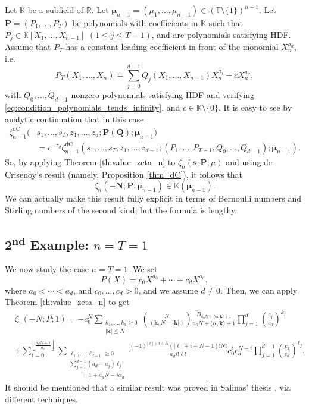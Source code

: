 \documentclass[a4paper,12pt]{article}
\theoremstyle{definition}
\numberwithin{equation}{section}
\newcommand{\dc}{\mathrm{dC}}
\begin{document}
Let $\mathbb{K}$ be a subfield of $\mathbb{R}$. Let $\boldsymbol{\mu}_{n-1}=(\mu_1,\ldots,\mu_{n-1}) \in (\mathbb{T} \setminus \{ 1 \})^{n-1}$. Let $\mathbf{P}=(P_1,\ldots,P_T)$ be polynomials with coefficients in $\mathbb{K}$ such that $P_j \in \mathbb{K}[X_1,\ldots,X_{n-1}]$ $(1 \leq j \leq T-1)$, and are polynomials satisfying HDF. Assume that $P_T$ has a constant leading coefficient in front of the monomial $X_n^{a_d}$, i.e.
$$ P_T(X_1,\ldots,X_n) = \sum_{j=0}^{d-1} Q_j(X_1,\ldots,X_{n-1}) X_n^{a_j}+cX_n^{a_d}, $$
with $Q_0,\ldots,Q_{d-1}$ nonzero polynomials satisfying HDF and verifying \eqref{eq:condition_polynomials_tends_infinity}, and $c \in \mathbb{K} \setminus \{0\}$. 
It is easy to see by analytic continuation that in this case 
\begin{align*}
    \zeta_{n-1}^{\dc}(&s_1,\ldots,s_{T},z_1,\ldots, z_d;\mathbf{P(Q)};\boldsymbol{\mu}_{n-1})\\
    &= c^{-z_d} \zeta_{n-1}^{\dc}(s_1,\ldots,s_{T},z_1,\ldots, z_{d-1};(P_1,\ldots,P_{T-1}, Q_0,\ldots, Q_{d-1});\boldsymbol{\mu}_{n-1}).
\end{align*}
So, by applying Theorem \ref{th:value_zeta_n} to $\zeta_n(\mathbf{s};\mathbf{P};\mu)$ and using de Crisenoy's result (namely, Proposition \ref{thm_dC}), it follows that
$$ \zeta_{n}(-\mathbf{N};\mathbf{P};\boldsymbol{\mu}_{n-1}) \in \mathbb{K}(\boldsymbol{\mu}_{n-1}). $$
We can actually make this result fully explicit in terms of Bernoulli numbers and Stirling numbers of the second kind, but the formula is lengthy.

\subsection{\texorpdfstring{2\textsuperscript{nd}}{Second} Example: \texorpdfstring{$n=T=1$}{n and T equal 1}}

We now study the case $n=T=1$. We set 
$$ P(X)=c_0X^{a_0}+\cdots +c_dX^{a_d},$$ 
where $a_0<\cdots <a_d$, and $c_0,\ldots,c_d > 0$, and we assume $d \neq 0$. Then, we can apply Theorem \ref{th:value_zeta_n} to get
\begin{align*}
    &\zeta_1(-N;P;1)=-c_0^{N}\sum_{\substack{k_1,\ldots,k_d \geq 0 \\ |\mathbf{k}| \leq N}} \binom{N}{(\mathbf{k},N-|\mathbf{k}|)} \frac{\widetilde{B}_{a_0N+\langle \boldsymbol{\alpha},\mathbf{k}\rangle+1}}{a_0N+\langle \boldsymbol{\alpha},\mathbf{k} \rangle+1}\prod_{j=1}^d \left(\frac{c_j}{c_0} \right)^{k_j} \\
    &+\sum_{i=0}^{\left\lfloor \frac{a_dN+1}{\alpha_d}\right\rfloor} \sum_{\substack{\ell_1,\ldots,\ell_{d-1} \geq 0 \\ \sum_{j=1}^{d-1} (a_d-a_j) \ell_j \\ \qquad =1+a_dN-i\alpha_d}} \frac{(-1)^{|\boldsymbol{\ell}|+i+N}(|\boldsymbol{\ell}|+i-N-1)!N!}{a_di!\boldsymbol{\ell}!} c_0^{i} c_d^{N-i} \prod_{j=1}^{d-1} \left(\frac{c_j}{c_d} \right)^{\ell_j}.
\end{align*}
It should be mentioned that a similar result was proved in Salinas' thesis \cite{Salinas}, via different techniques.
\end{document}
